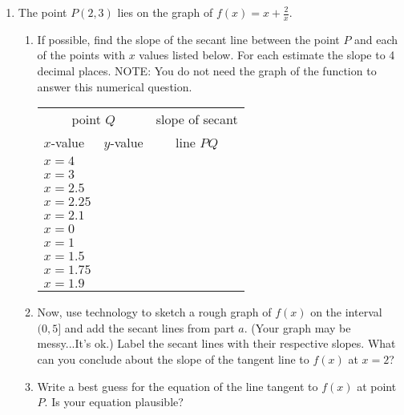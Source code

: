 \documentclass[11pt,fleqn]{article}
\begin{document}
\renewcommand{\headrulewidth}{0pt}
\newcommand{\blank}[1]{\rule{#1}{0.75pt}}
\renewcommand{\d}{\displaystyle}


\vspace*{-1in}
\begin{center}
\end{center}
\begin{enumerate}
\item The point $P(2,3)$ lies on the graph of $f(x)=x+\frac{2}{x}.$
	\begin{enumerate}
	\item If possible, find the slope of the secant line between the point $P$ and each of the points with $x$ values listed below. For each estimate the slope to 4 decimal places. NOTE: You do not need the graph of the function to answer this numerical question.\\
		{\LARGE{\begin{center}
		\begin{tabular}{l | l | c}
		\multicolumn{2}{c}{point $Q$}& slope of secant \\
		$x$-value&\quad$y$-value \quad \quad&line $PQ$\\
		\hline
		$x=4$&&\\
		\hline
		$x=3$&&\\
		\hline
		$x=2.5$&&\\
		\hline
		$x=2.25$&&\\
		\hline
		$x=2.1$&&\\
		\hline
		$x=0$&&\\
		\hline
		$x=1$&&\\
		\hline
		$x=1.5$&&\\
		\hline
		$x=1.75$&&\\
		\hline
		$x=1.9$&&\\
		\hline
		\end{tabular}
		\end{center}}}
	\item  Now, use technology to sketch a rough graph of $f(x)$ on the interval $(0,5]$ and add the secant lines from part $a$. (Your graph may be messy...It's ok.) Label the secant lines with their respective slopes. What can you conclude about the slope of the tangent line to $f(x)$ at $x=2$?
	\vfill
	\item Write a best guess for the equation of the line tangent to $f(x)$ at point $P$. Is your equation plausible?
	\vspace{.5in}
	\end{enumerate}
	\newpage


\end{enumerate}
\end{document}

